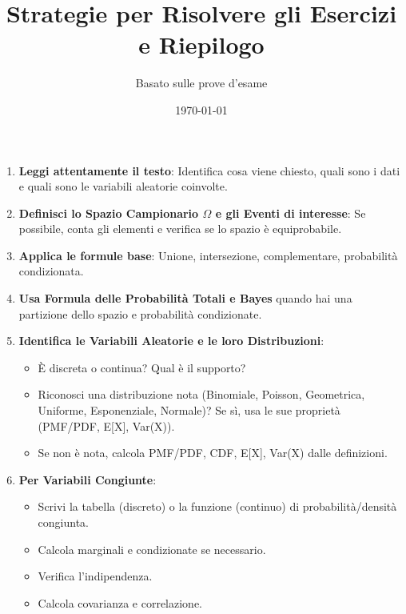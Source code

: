 

\title{Strategie per Risolvere gli Esercizi e Riepilogo}
\author{Basato sulle prove d'esame}
\date{\today}



\maketitle
\tableofcontents
\newpage

\begin{enumerate}
    \item \textbf{Leggi attentamente il testo}: Identifica cosa viene chiesto, quali sono i dati e quali sono le variabili aleatorie coinvolte.
    \item \textbf{Definisci lo Spazio Campionario $\Omega$ e gli Eventi di interesse}: Se possibile, conta gli elementi e verifica se lo spazio è equiprobabile.
    \item \textbf{Applica le formule base}: Unione, intersezione, complementare, probabilità condizionata.
    \item \textbf{Usa Formula delle Probabilità Totali e Bayes} quando hai una partizione dello spazio e probabilità condizionate.
    \item \textbf{Identifica le Variabili Aleatorie e le loro Distribuzioni}:
        \begin{itemize}
            \item È discreta o continua? Qual è il supporto?
            \item Riconosci una distribuzione nota (Binomiale, Poisson, Geometrica, Uniforme, Esponenziale, Normale)? Se sì, usa le sue proprietà (PMF/PDF, E[X], Var(X)).
            \item Se non è nota, calcola PMF/PDF, CDF, E[X], Var(X) dalle definizioni.
        \end{itemize}
    \item \textbf{Per Variabili Congiunte}:
        \begin{itemize}
            \item Scrivi la tabella (discreto) o la funzione (continuo) di probabilità/densità congiunta.
            \item Calcola marginali e condizionate se necessario.
            \item Verifica l'indipendenza.
            \item Calcola covarianza e correlazione.
        \end{itemize}

\end{enumerate}
